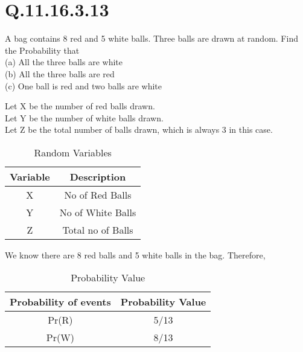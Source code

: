 \documentclass[journal,12pt,twocolumn]{IEEEtran}
\theoremstyle{remark}
\begin{document}
\section{\huge Q.11.16.3.13}
\large A bag contains 8 red and 5 white balls. Three balls are drawn at random. Find the
Probability that\\
(a) All the three balls are white\\
(b) All the three balls are red\\
(c) One ball is red and two balls are white\\

\solution

Let X be the number of red balls drawn.\\
Let Y be the number of white balls drawn.\\
Let Z be the total number of balls drawn, which is always 3 in this case.\\
\begin{table}
    \centering
    \begin{tabular}{|c|c|}

        \hline
        Variable & Description \\
        \hline
        X & No of Red Balls \\
        \hline
        Y & No of White Balls\\
        \hline
        Z & Total no of Balls\\
        \hline
    
        
    \end{tabular}
    \caption{Random Variables}
    \label{table-1}

\end{table}
We know there are 8 red balls and 5 white balls in the bag. Therefore,

\begin{table}
    \centering
    \begin{tabular}{|c|c|}

        \hline
        Probability of events & Probability Value\\
        \hline
        Pr(R) & 5/13\\
        \hline
        Pr(W) & 8/13\\
        \hline
    
        
    \end{tabular}
    \caption{Probability Value}
    \label{table-2}
    

\end{table}
\end{document}
